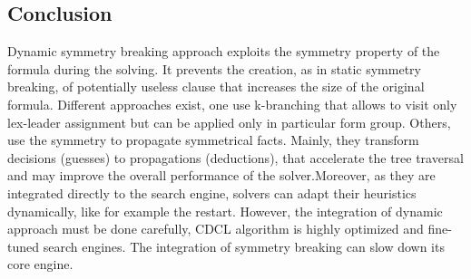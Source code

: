 \subsection{Conclusion} 
Dynamic symmetry breaking approach exploits the symmetry property of the formula during the solving.
It prevents the creation, as in static symmetry breaking, of potentially useless clause that increases the size of the original formula.
Different approaches exist, one use k-branching that allows to visit only lex-leader assignment but can be applied only in particular form group.
Others, use the symmetry to propagate symmetrical facts.
Mainly, they transform decisions (guesses) to propagations (deductions), that accelerate the tree traversal and may improve the overall
performance of the solver.Moreover, as they are integrated directly to the search engine, solvers can adapt their heuristics dynamically, like for
example the restart.
However, the integration of dynamic approach must be done carefully, CDCL algorithm is highly optimized and 
fine-tuned search engines. The integration of symmetry breaking can slow down its core engine.

%

